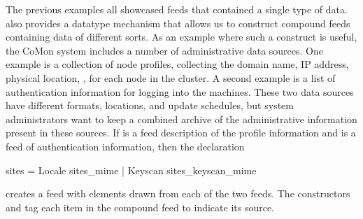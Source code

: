 The previous examples all showcased feeds that contained a single type
of data.  \padsd{} also provides a datatype mechanism that allows us
to construct compound feeds containing data of different sorts.  As an
example where such a construct is useful, the CoMon system includes a
number of administrative data sources.  One example is a collection of
node profiles, collecting the domain name, IP address, physical
location, \etc, for each node in the cluster.  A second example is a
list of authentication information for logging into the machines.
These two data sources have different formats, locations, and update
schedules, but system administrators want to keep a combined archive
of the administrative information present in these sources.  If
 is a feed description of the profile
information and  is a feed of authentication
information, then the declaration
%
\begin{code}
 sites = 
    Locale  sites_mime
  | Keyscan  sites_keyscan_mime
\end{code}
%
creates a feed with elements drawn from each of the two 
feeds.  The constructors  and  tag each item in
the compound feed to indicate its source. 


